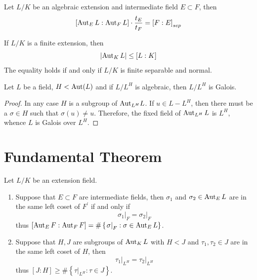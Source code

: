 \begin{corollary}
    Let $L/K$ be an algebraic extension and intermediate field $E\subset F$, then
    \begin{equation*}
        \left[\operatorname{\operatorname{Aut}}_E L:\operatorname{\operatorname{Aut}}_F L\right]\cdot \frac{t_E}{t_F}
        =
        \left[F:E\right]_
        {sep}
    \end{equation*}

\end{corollary}

\begin{corollary}
    If $L/K$ is a finite extension, then
    \begin{equation*}
        \left|\operatorname{\operatorname{Aut}}_{K} L\right| \leq \left[L: K\right]
    \end{equation*}
    The equality holds if and only if $L/K$ is finite separable and normal.
\end{corollary}

\begin{proposition}
    Let $L$ be a field, $H< \operatorname{\operatorname{Aut}}(L)$ and if $L/L^H$ is algebraic, then $L/L^H$ is Galois.
    \begin{proof}
        In any case $H$ is a subgroup of ${\operatorname{\operatorname{Aut}}}_{L^H}L$.
        If $u \in L-L^H$, then there must be a $\sigma \in H$ such that $\sigma(u) \neq u$. Therefore, the fixed field of $\operatorname{\operatorname{Aut}}_{L^H} L$ is $L^H$, whence $L$ is Galois over $L^H$.
    \end{proof}
\end{proposition}



\section{Fundamental Theorem} %

\begin{proposition}
    Let $L/K$ be an extension field.
    \begin{enumerate}
        \item
              Suppose that $E\subset F$ are intermediate fields, then $\sigma_1$ and $\sigma_2 \in \operatorname{\operatorname{Aut}}_E L$ are in the same left coset of $F^\prime$ if and only if
              \begin{equation*}
                  \left.\sigma_1\right|_{F}
                  =
                  \left.\sigma_2\right|_{F}
              \end{equation*}
              thus $\left[\operatorname{\operatorname{Aut}}_E F: \operatorname{\operatorname{Aut}}_{F} F\right]=\# \left\{\left.\sigma\right|_F: \sigma \in \operatorname{\operatorname{Aut}}_E L\right\}$.

        \item
              Suppose that $H,J $ are subgroups of $\operatorname{\operatorname{Aut}}_K L$ with $H<J$ and $\tau_1,\tau_2\in J$ are in the same left coset of $H$, then
              \begin{equation*}
                  \left.\tau_1\right|_{L^H}
                  =
                  \left.\tau_2\right|_{L^H}
              \end{equation*}
              thus $\left[J: H\right]\geq \# \left\{\left.\tau\right|_{L^H}: \tau \in J\right\}$.
    \end{enumerate}
\end{proposition}

